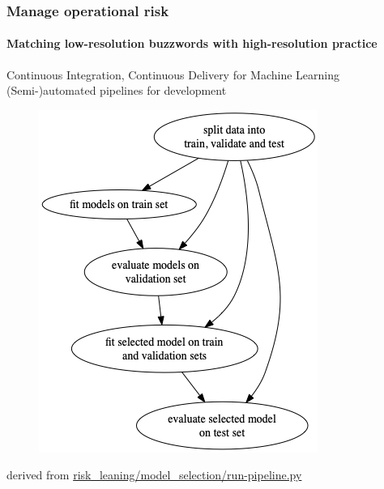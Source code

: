 \begin{frame}
    \frametitle{Manage operational risk}
    \framesubtitle{Matching low-resolution buzzwords with high-resolution practice}

    \begin{block}{Continuous Integration, Continuous Delivery for Machine Learning}
        (Semi-)automated pipelines for development
        \begin{figure}[ht]
            \includegraphics[height=0.5\textheight]{graphics/ml_pipeline}
        \end{figure}
        derived from \href{https://github.com/munichpavel/risk-ai-workshop/blob/main/risk_learning/model_selection/run-pipeline.py}{risk\_leaning/model\_selection/run-pipeline.py}
    \end{block}
\end{frame}


